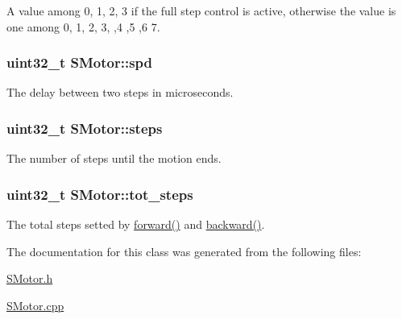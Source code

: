 A value among 0, 1, 2, 3 if the full step control is active, otherwise the value is one among 0, 1, 2, 3, ,4 ,5 ,6 7. 

\hypertarget{class_s_motor_a882d15d35626b66d6bb31a09c17b75b6}{
\subsubsection[{spd}]{\setlength{\rightskip}{0pt plus 5cm}uint32\+\_\+t S\+Motor\+::spd\hspace{0.3cm}{\ttfamily [private]}}}\label{class_s_motor_a882d15d35626b66d6bb31a09c17b75b6}


The delay between two steps in microseconds. 

\hypertarget{class_s_motor_a894a18a9c90ea2160d5790934491f346}{
\subsubsection[{steps}]{\setlength{\rightskip}{0pt plus 5cm}uint32\+\_\+t S\+Motor\+::steps\hspace{0.3cm}{\ttfamily [private]}}}\label{class_s_motor_a894a18a9c90ea2160d5790934491f346}


The number of steps until the motion ends. 

\hypertarget{class_s_motor_acba02a638986e8e3e44302d824941692}{
\subsubsection[{tot\+\_\+steps}]{\setlength{\rightskip}{0pt plus 5cm}uint32\+\_\+t S\+Motor\+::tot\+\_\+steps\hspace{0.3cm}{\ttfamily [private]}}}\label{class_s_motor_acba02a638986e8e3e44302d824941692}


The total steps setted by \hyperlink{class_s_motor_ae266c2af254d76012b8132bb7641628d}{forward()} and \hyperlink{class_s_motor_a9d666d613dffcc324e0ae6e1e0a31a3f}{backward()}. 



The documentation for this class was generated from the following files\+:\begin{DoxyCompactItemize}
\item 
\hyperlink{_s_motor_8h}{S\+Motor.\+h}\item 
\hyperlink{_s_motor_8cpp}{S\+Motor.\+cpp}\end{DoxyCompactItemize}
